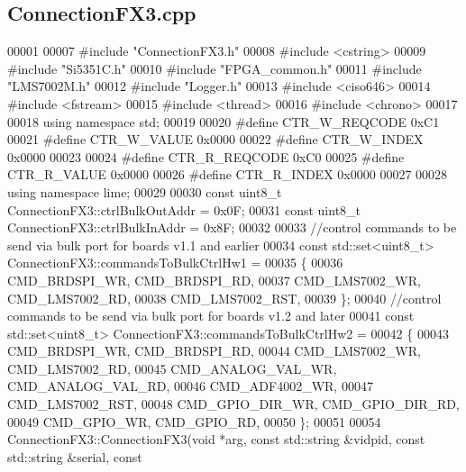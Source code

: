 \subsection{Connection\+F\+X3.\+cpp}
\label{ConnectionFX3_8cpp_source}

\begin{DoxyCode}
00001 
00007 \textcolor{preprocessor}{#include "ConnectionFX3.h"}
00008 \textcolor{preprocessor}{#include <cstring>}
00009 \textcolor{preprocessor}{#include "Si5351C.h"}
00010 \textcolor{preprocessor}{#include "FPGA_common.h"}
00011 \textcolor{preprocessor}{#include "LMS7002M.h"}
00012 \textcolor{preprocessor}{#include "Logger.h"}
00013 \textcolor{preprocessor}{#include <ciso646>}
00014 \textcolor{preprocessor}{#include <fstream>}
00015 \textcolor{preprocessor}{#include <thread>}
00016 \textcolor{preprocessor}{#include <chrono>}
00017 
00018 \textcolor{keyword}{using namespace }std;
00019 
00020 \textcolor{preprocessor}{#define CTR\_W\_REQCODE 0xC1}
00021 \textcolor{preprocessor}{#define CTR\_W\_VALUE 0x0000}
00022 \textcolor{preprocessor}{#define CTR\_W\_INDEX 0x0000}
00023 
00024 \textcolor{preprocessor}{#define CTR\_R\_REQCODE 0xC0}
00025 \textcolor{preprocessor}{#define CTR\_R\_VALUE 0x0000}
00026 \textcolor{preprocessor}{#define CTR\_R\_INDEX 0x0000}
00027 
00028 \textcolor{keyword}{using namespace }lime;
00029 
00030 \textcolor{keyword}{const} uint8\_t ConnectionFX3::ctrlBulkOutAddr = 0x0F;
00031 \textcolor{keyword}{const} uint8\_t ConnectionFX3::ctrlBulkInAddr = 0x8F;
00032 
00033 \textcolor{comment}{//control commands to be send via bulk port for boards v1.1 and earlier}
00034 \textcolor{keyword}{const} std::set<uint8\_t> ConnectionFX3::commandsToBulkCtrlHw1 =
00035 \{
00036     CMD_BRDSPI_WR, CMD_BRDSPI_RD,
00037     CMD_LMS7002_WR, CMD_LMS7002_RD,
00038     CMD_LMS7002_RST,
00039 \};
00040 \textcolor{comment}{//control commands to be send via bulk port for boards v1.2 and later}
00041 \textcolor{keyword}{const} std::set<uint8\_t> ConnectionFX3::commandsToBulkCtrlHw2 =
00042 \{
00043     CMD_BRDSPI_WR, CMD_BRDSPI_RD,
00044     CMD_LMS7002_WR, CMD_LMS7002_RD,
00045     CMD_ANALOG_VAL_WR, CMD_ANALOG_VAL_RD,
00046     CMD_ADF4002_WR,
00047     CMD_LMS7002_RST,
00048     CMD_GPIO_DIR_WR, CMD_GPIO_DIR_RD,
00049     CMD_GPIO_WR, CMD_GPIO_RD,
00050 \};
00051 
00054 ConnectionFX3::ConnectionFX3(\textcolor{keywordtype}{void} *arg, \textcolor{keyword}{const} std::string &vidpid, \textcolor{keyword}{const} std::string &serial, \textcolor{keyword}{const} \textcolor{keywordtype}{
}
\end{DoxyCode}

